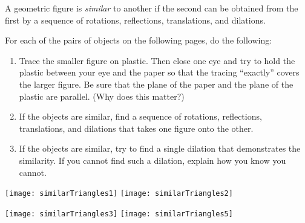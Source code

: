 \documentclass[nooutcomes]{ximera}
\begin{document}

\begin{definition}
A geometric figure is \emph{similar} to another if the second can be obtained from the first by a sequence of rotations, reflections, translations, and dilations.  
\end{definition}

\begin{problem}
For each of the pairs of objects on the following pages, do the following:  
\begin{enumerate}
\item Trace the smaller figure on plastic.  Then close one eye and try to hold the plastic between your eye and the paper so that the tracing ``exactly'' covers the larger figure.   Be sure that the plane of the paper and the plane of the plastic are parallel.  (Why does this matter?) 
\item If the objects are similar, find a sequence of rotations, reflections, translations, and dilations that takes one figure onto the other.  
\item If the objects are similar, try to find a single dilation that demonstrates the similarity.   If you cannot find such a dilation, explain how you know you cannot.  
\end{enumerate}
\begin{image}
\texttt{[image: similarTriangles1]}
\texttt{[image: similarTriangles2]}
\end{image}
\vfill

\newpage
\vfill
\begin{image}
\texttt{[image: similarTriangles3]}
\vfill
\texttt{[image: similarTriangles5]}
\end{image}
\vfill
\end{problem}
\end{document}
